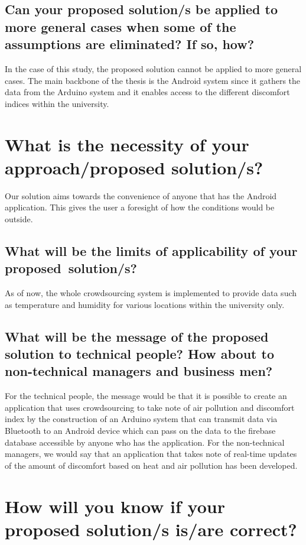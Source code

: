   
\subsection{Can your proposed solution/s be applied to more general cases when some of the assumptions are eliminated? If so, how?}

In the case of this study, the proposed solution cannot be applied to more general cases. The main backbone of the thesis is the Android system since it gathers the data from the Arduino system and it enables access to the different discomfort indices within the university.


\section{What is the necessity of your approach/proposed solution/s?}

Our solution aims towards the convenience of anyone that has the Android application. This gives the user a foresight of how the conditions would be outside.
	
\subsection{What will be the limits of applicability of your proposed~solution/s?}

As of now, the whole crowdsourcing system is implemented to provide data such as temperature and humidity for various locations within the university only.
					  
\subsection{What will be the message of the proposed solution to technical people?  How about to non-technical managers and business men?}
			
For the technical people, the message would be that it is possible to create an application that uses crowdsourcing to take note of air pollution and discomfort index by the construction of an Arduino system that can transmit data via Bluetooth to an Android device which can pass on the data to the firebase database accessible by anyone who has the application. For the non-technical managers, we would say that an application that takes note of real-time updates of the amount of discomfort based on heat and air pollution has been developed.



\section{How will you know if your proposed solution/s is/are correct?}

